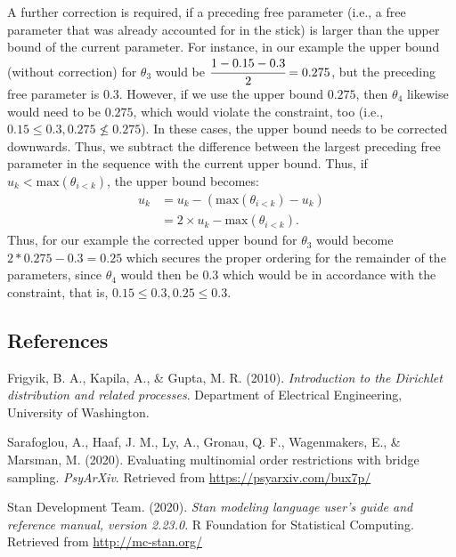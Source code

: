 \begin{appendix}
A further correction is required, if a preceding free parameter (i.e., a
free parameter that was already accounted for in the stick) is larger
than the upper bound of the current parameter. For instance, in our
example the upper bound (without correction) for \(\theta_3\) would be
\(\cfrac{1 - 0.15 - 0.3}{2} = 0.275\), but the preceding free parameter
is \(0.3\). However, if we use the upper bound \(0.275\), then
\(\theta_4\) likewise would need to be \(0.275\), which would violate
the constraint, too (i.e., \(0.15 \leq 0.3, 0.275 \nleq 0.275\)). In
these cases, the upper bound needs to be corrected downwards. Thus, we
subtract the difference between the largest preceding free parameter in
the sequence with the current upper bound. Thus, if
\(u_k < \text{max}(\theta_{i < k})\), the upper bound becomes:
\begin{align}
u_k &= u_k - (\text{max}(\theta_{i < k}) - u_k) \\
    &= 2 \times u_k - \text{max}(\theta_{i < k}).
\end{align} Thus, for our example the corrected upper bound for
\(\theta_3\) would become \(2*0.275 - 0.3 = 0.25\) which secures the
proper ordering for the remainder of the parameters, since \(\theta_4\)
would then be \(0.3\) which would be in accordance with the constraint,
that is, \(0.15 \leq 0.3, 0.25 \leq 0.3\).

\hypertarget{references}{%
\subsection{References}\label{references}}

\begingroup
\setlength{\parindent}{-0.5in}
\setlength{\leftskip}{0.5in}

\hypertarget{refs}{}
\begin{cslreferences}
\leavevmode\hypertarget{ref-frigyik2010introduction}{}%
Frigyik, B. A., Kapila, A., \& Gupta, M. R. (2010). \emph{Introduction
to the Dirichlet distribution and related processes}. Department of
Electrical Engineering, University of Washington.

\leavevmode\hypertarget{ref-sarafoglou2020evaluatingPreprint}{}%
Sarafoglou, A., Haaf, J. M., Ly, A., Gronau, Q. F., Wagenmakers, E., \&
Marsman, M. (2020). Evaluating multinomial order restrictions with
bridge sampling. \emph{PsyArXiv}. Retrieved from
\url{https://psyarxiv.com/bux7p/}

\leavevmode\hypertarget{ref-stan2020}{}%
Stan Development Team. (2020). \emph{Stan modeling language user's guide
and reference manual, version 2.23.0}. R Foundation for Statistical
Computing. Retrieved from \url{http://mc-stan.org/}
\end{cslreferences}

\endgroup
\end{appendix}

